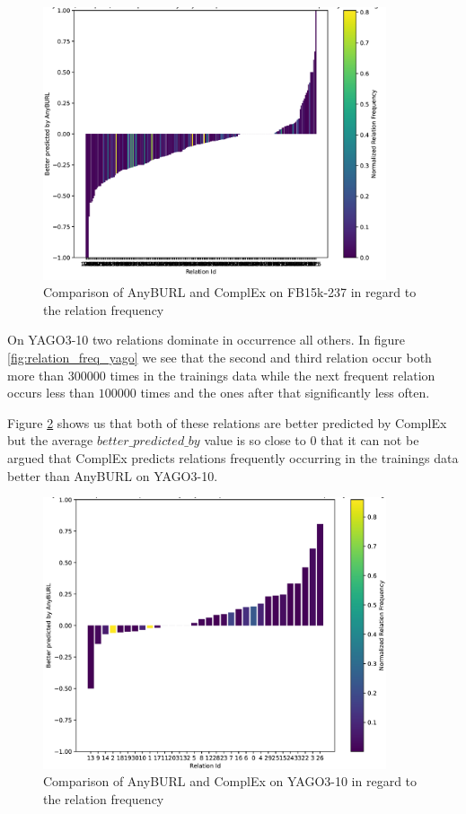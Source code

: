 \begin{figure}[H]
\centering
\includegraphics[width=0.9\textwidth]{images/relation_freq_anyburl_complex_fb15k.PNG}
\caption{Comparison of AnyBURL and ComplEx on FB15k-237 in regard to the relation frequency}
\label{fig:relation_freq_anyburl_complex_fb15k}
\end{figure}

On YAGO3-10 two relations dominate in occurrence all others. In figure \ref{fig:relation_freq_yago} we see that the second and third relation occur both more than $300000$ times in the trainings data while the next frequent relation occurs less than $100000$ times and the ones after that significantly less often. 

Figure \ref{fig:relation_freq_anyburl_complex_yago} shows us that both of these relations are better predicted by ComplEx but the average $better\_predicted\_by$ value is so close to $0$ that it can not be argued that ComplEx predicts relations frequently occurring in the trainings data better than AnyBURL on YAGO3-10.

\begin{figure}[H]
\centering
\includegraphics[width=0.9\textwidth]{images/relation_freq_anyburl_complex_yago.PNG}
\caption{Comparison of AnyBURL and ComplEx on YAGO3-10 in regard to the relation frequency}
\label{fig:relation_freq_anyburl_complex_yago}
\end{figure}

